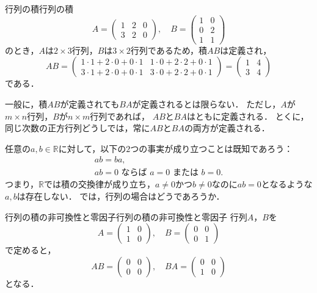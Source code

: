 \begin{example}{行列の積}{行列の積}
  \[
    A = \begin{pmatrix} 1 & 2 & 0 \\ 3 & 2 & 0 \end{pmatrix}, \quad
    B = \begin{pmatrix} 1 & 0 \\ 0 & 2 \\ 1 & 1 \end{pmatrix}
  \]
  のとき，$A$は$2 \times 3$行列，$B$は$3 \times 2$行列であるため，積$AB$は定義され，
  \[
    AB =
    \begin{pmatrix}
      1 \cdot 1 + 2 \cdot 0 + 0 \cdot 1 & 1 \cdot 0 + 2 \cdot 2 + 0 \cdot 1 \\
      3 \cdot 1 + 2 \cdot 0 + 0 \cdot 1 & 3 \cdot 0 + 2 \cdot 2 + 0 \cdot 1
    \end{pmatrix}
    =
    \begin{pmatrix}
      1 & 4 \\
      3 & 4
    \end{pmatrix}
  \]
  である．
\end{example}

一般に，積$AB$が定義されても$BA$が定義されるとは限らない．
ただし，$A$が$m\times n$行列，$B$が$n\times m$行列であれば，
$AB$と$BA$はともに定義される．
とくに，同じ次数の正方行列どうしでは，常に$AB$と$BA$の両方が定義される．

任意の$a, b \in \mathbb{R}$に対して，以下の$2$つの事実が成り立つことは既知であろう：
\begin{gather*}
  ab = ba, \\
  ab = 0 \text{ ならば } a = 0 \text{ または } b = 0.
\end{gather*}
つまり，$\mathbb{R}$では積の交換律が成り立ち，$a \ne 0$かつ$b \ne 0$なのに$ab = 0$となるような$a, b$は存在しない．
では，行列の場合はどうであろうか．

\begin{example}{行列の積の非可換性と零因子}{行列の積の非可換性と零因子}
  行列$A$，$B$を
  \[
    A = \begin{pmatrix} 1 & 0 \\ 1 & 0 \end{pmatrix}, \quad
    B = \begin{pmatrix} 0 & 0 \\ 0 & 1 \end{pmatrix}
  \]
  で定めると，
  \[
    AB = \begin{pmatrix} 0 & 0 \\ 0 & 0 \end{pmatrix}, \quad
    BA = \begin{pmatrix} 0 & 0 \\ 1 & 0 \end{pmatrix}
  \]
  となる．
\end{example}


